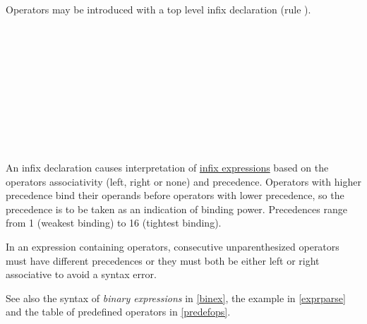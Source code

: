 Operators may be introduced with a top level infix declaration (rule ).

\begin{flushleft}
   
\\
  \oder{}  \oder{} \\
 \regex{[123456789]} \oder{} \\

   \\
  \oder{}  \oder{} \\
  \regex{)}\\
 \regex{::} \oder{}
   \regex{->} \oder{}
   \regex{<-} \oder{} \regex{=>} \oder{}
   \regex{$\backslash{}|$} \oder{}
   \regex{=} \oder{} \regex{-} \oder{}
   \regex{!} \oder{}  \oder{}
   \regex{,} \oder{} \regex{;} \oder{}
    \oder{}
   \regex{$\backslash{}\backslash{}$} \oder{}
   \regex{\_} \oder{}
   \regex{$\forall$}\\

 \regex{$\backslash{}$(} \oder{} \regex{$\backslash{}$)} \oder{} \regex{$\backslash{}$[} \oder{} \regex{$\backslash{}$]} \oder{} \regex{$\backslash{}$\{} \oder{} \regex{$\backslash{}$\}}\\

 \regex{["'´`]}\\
\end{flushleft}

An infix declaration causes interpretation of \hyperref[binex]{infix expressions} based on the operators associativity (left, right or none) and precedence.
Operators with higher precedence bind their operands before operators with lower precedence, so the precedence is to be taken as an indication of binding power.
Precedences range from 1 (weakest binding) to 16 (tightest binding).

In an expression containing operators, consecutive unparenthesized operators must have different precedences or they must both be either left or right associative to
avoid a syntax error.


See also the syntax of \emph{binary expressions} in \autoref{binex}, the example in \autoref{exprparse} and the table of predefined operators in \autoref{predefops}.

